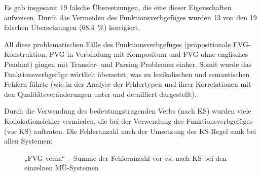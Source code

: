 Es gab insgesamt 19 falsche Übersetzungen, die eine dieser Eigenschaften aufweisen. Durch das Vermeiden des Funktionsverbgefüges wurden 13 von den 19 falschen Übersetzungen (68,4~\%) korrigiert.

All diese problematischen Fälle des Funktionsverbgefüges (präpositionale FVG-Konstruktion, FVG in Verbindung mit Kompositum und FVG ohne englisches Pendant) gingen mit Transfer- und Parsing-Problemen einher. Somit wurde das Funktionsverbgefüge wörtlich übersetzt, was zu lexikalischen und semantischen Fehlern führte (wie in der Analyse der Fehlertypen und ihrer Korrelationen mit den Qualitätsveränderungen unter  und  detailliert dargestellt).


Durch die Verwendung des bedeutungstragenden Verbs (nach KS) wurden viele Kollokationsfehler vermieden, die bei der Verwendung des Funktionsverbgefüges (vor KS) auftraten. Die Fehleranzahl nach der Umsetzung der KS-Regel sank bei allen Systemen:


\begin{figure}













\caption{\label{fig:05:35} „FVG verm.“ -- Summe der Fehleranzahl vor vs. nach KS bei den einzelnen MÜ-Systemen  }
\end{figure}

